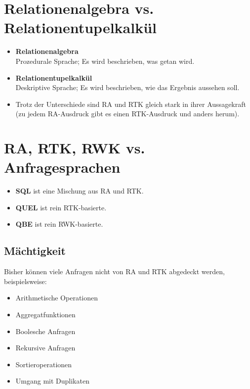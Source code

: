 	\section{Relationenalgebra vs. Relationentupelkalkül} %
		\begin{itemize}
			\item \textbf{Relationenalgebra} \\ Prozedurale Sprache; Es wird beschrieben, was getan wird.
			\item \textbf{Relationentupelkalkül} \\ Deskriptive Sprache; Es wird beschrieben, wie das Ergebnis aussehen soll.
			\item Trotz der Unterschiede sind RA und RTK gleich stark in ihrer Aussagekraft (zu jedem RA-Ausdruck gibt es einen RTK-Ausdruck und anders herum).
		\end{itemize}

	\section{RA, RTK, RWK vs. Anfragesprachen} %
		\begin{itemize}
			\item \textbf{SQL} ist eine Mischung aus RA und RTK.
			\item \textbf{QUEL} ist rein RTK-basierte.
			\item \textbf{QBE} ist rein RWK-basierte.
		\end{itemize}

		\subsection{Mächtigkeit} %
			Bisher können viele Anfragen nicht von RA und RTK abgedeckt werden, beispielsweise:
			\begin{itemize}
				\item Arithmetische Operationen
				\item Aggregatfunktionen
				\item Boolesche Anfragen
				\item Rekursive Anfragen
				\item Sortieroperationen
				\item Umgang mit Duplikaten
			\end{itemize}

